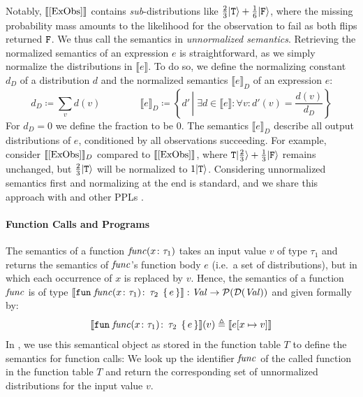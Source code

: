 Notably, $\llbracket \text{\ref{ExObs}} \rrbracket$ contains \textit{sub}-distributions like $\frac{2}{3}|\texttt{T} \rangle + \frac{1}{6}|\texttt{F}\rangle$, where the missing probability mass amounts to the likelihood for the observation to fail as both flips returned $\texttt{F}$.
We thus call the semantics in  \textit{unnormalized semantics}. 
Retrieving the normalized semantics of an expression $e$ is straightforward, as we simply normalize the distributions in $\llbracket e \rrbracket$.
To do so, we define the normalizing constant $d_D$ of a distribution $d$ and the normalized semantics $\llbracket e \rrbracket_D$ of an expression $e$:
%
$$ d_D \coloneqq \sum_{v} d(v) \qquad \qquad \llbracket e \rrbracket_D \coloneqq \left\{d' \,\left|\; \exists d\in \llbracket e \rrbracket \colon \forall v \colon d'(v) = \frac{d(v)}{d_D} \right. \right\}$$
%
For $d_D = 0$ we define the fraction to be $0$.
The semantics $\llbracket e \rrbracket_D$ describe all output distributions of $e$, conditioned by all observations succeeding.
For example, consider $\llbracket \text{\ref{ExObs}} \rrbracket_D$ compared to $\llbracket \text{\ref{ExObs}} \rrbracket$, where $\texttt{T}|\frac{2}{3}\rangle + \frac{1}{3} |\texttt{F} \rangle$ remains unchanged, but $\frac{2}{3}|\texttt{T} \rangle$ will be normalized to $1|\texttt{T}\rangle$.
Considering unnormalized semantics first and normalizing at the end is standard, and we share this approach with \DICE and other PPLs \cite{claret2013bayesian, fierens2015inference}.


\paragraph{Function Calls and Programs}
The semantics of a function $\mathit{func}(x \colon \tau_1)$ takes an input value $v$ of type $\tau_1$ and returns the semantics of $\mathit{func}$'s function body $e$ (i.e.\ a set of distributions), but in which each occurrence of $x$ is replaced by $v$.
Hence, the semantics of a \NDICE function $\mathit{func}$ is of type $\llbracket \texttt{fun} \; \mathit{func}(x\colon \tau_1)\colon \, \tau_2 \; \left\{\, e \,\right\}  \rrbracket: \mathit{Val} \rightarrow \mathcal{P}(\mathcal{D}(\mathit{Val}))$ and given formally by:
%
$$\llbracket \texttt{fun} \; \mathit{func}(x\colon \tau_1)\colon \, \tau_2 \; \left\{\, e \,\right\}  \rrbracket (v) \triangleq \llbracket e[x \mapsto v]\rrbracket$$
%
In , we use this semantical object as stored in the function table $T$ to define the semantics for function calls: 
We look up the identifier $\mathit{func}$ of the called function in the function table $T$ and return the corresponding set of unnormalized distributions for the input value $v$.

